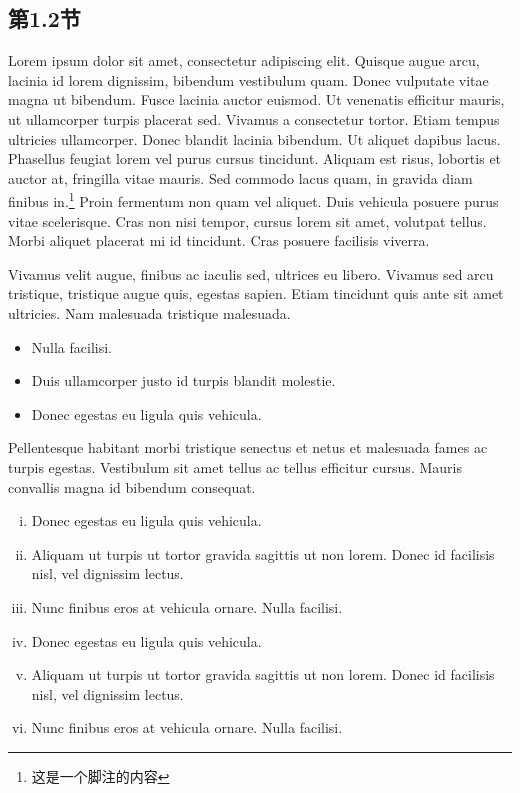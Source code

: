 \documentclass[11pt]{article}
\begin{document}
\subsection{第1.2节}
Lorem ipsum dolor sit amet, consectetur adipiscing elit. Quisque augue arcu, lacinia id lorem dignissim, bibendum vestibulum quam. Donec vulputate vitae magna ut bibendum. Fusce lacinia auctor euismod. Ut venenatis efficitur mauris, ut ullamcorper turpis placerat sed. Vivamus a consectetur tortor. Etiam tempus ultricies ullamcorper. Donec blandit lacinia bibendum. Ut aliquet dapibus lacus. Phasellus feugiat lorem vel purus cursus tincidunt. Aliquam est risus, lobortis et auctor at, fringilla vitae mauris. Sed commodo lacus quam, in gravida diam finibus in.\footnote{这是一个脚注的内容} Proin fermentum non quam vel aliquet. Duis vehicula posuere purus vitae scelerisque.\footnotemark{} Cras non nisi tempor, cursus lorem sit amet, volutpat tellus. Morbi aliquet placerat mi id tincidunt. Cras posuere facilisis viverra.


Vivamus velit augue, finibus ac iaculis sed, ultrices eu libero. Vivamus sed arcu tristique, tristique augue quis, egestas sapien. Etiam tincidunt quis ante sit amet ultricies. Nam malesuada tristique malesuada. 

\begin{itemize}
    \item Nulla facilisi. 
    \item Duis ullamcorper justo id turpis blandit molestie. 
    \item Donec egestas eu ligula quis vehicula. 
\end{itemize}

Pellentesque habitant morbi tristique senectus et netus et malesuada fames ac turpis egestas. Vestibulum sit amet tellus ac tellus efficitur cursus. Mauris convallis magna id bibendum consequat. 

\begin{enumerate}[(i).]
    \item Donec egestas eu ligula quis vehicula. 
    \item Aliquam ut turpis ut tortor gravida sagittis ut non lorem. Donec id facilisis nisl, vel dignissim lectus. 
    \item Nunc finibus eros at vehicula ornare. Nulla facilisi.
    \item Donec egestas eu ligula quis vehicula. 
    \item Aliquam ut turpis ut tortor gravida sagittis ut non lorem. Donec id facilisis nisl, vel dignissim lectus. 
    \item Nunc finibus eros at vehicula ornare. Nulla facilisi.
\end{enumerate}
\end{document}

